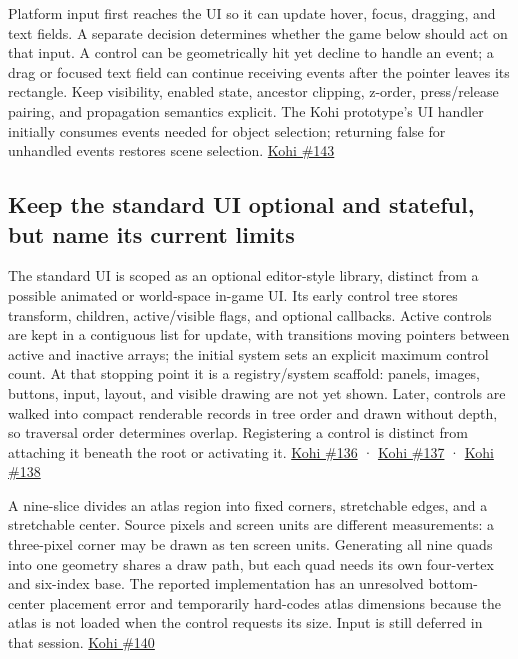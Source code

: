 \hypertarget{05-engine-i-ch013-treat-input-capture-as-a-route-not-a-hit-test-result}{}

Platform input first reaches the UI so it can update hover, focus, dragging, and text fields. A separate decision determines whether the game below should act on that input. A control can be geometrically hit yet decline to handle an event; a drag or focused text field can continue receiving events after the pointer leaves its rectangle. Keep visibility, enabled state, ancestor clipping, z-order, press/release pairing, and propagation semantics explicit. The Kohi prototype's UI handler initially consumes events needed for object selection; returning false for unhandled events restores scene selection. \href{https://www.youtube.com/watch?v=jLSfss8YrXE}{Kohi \#143}

\subsection{Keep the standard UI optional and stateful, but name its current limits}\label{05-engine-i-ch013-keep-the-standard-ui-optional-and-stateful-but-name-its-current-limits}

\hypertarget{05-engine-i-ch013-keep-the-standard-ui-optional-and-stateful-but-name-its-current-limits}{}

The standard UI is scoped as an optional editor-style library, distinct from a possible animated or world-space in-game UI. Its early control tree stores transform, children, active/visible flags, and optional callbacks. Active controls are kept in a contiguous list for update, with transitions moving pointers between active and inactive arrays; the initial system sets an explicit maximum control count. At that stopping point it is a registry/system scaffold: panels, images, buttons, input, layout, and visible drawing are not yet shown. Later, controls are walked into compact renderable records in tree order and drawn without depth, so traversal order determines overlap. Registering a control is distinct from attaching it beneath the root or activating it. \href{https://www.youtube.com/watch?v=IGt08az4bLA}{Kohi \#136} · \href{https://www.youtube.com/watch?v=ptdE4nbVN0U}{Kohi \#137} · \href{https://www.youtube.com/watch?v=xqExSNvOc6A}{Kohi \#138}

A nine-slice divides an atlas region into fixed corners, stretchable edges, and a stretchable center. Source pixels and screen units are different measurements: a three-pixel corner may be drawn as ten screen units. Generating all nine quads into one geometry shares a draw path, but each quad needs its own four-vertex and six-index base. The reported implementation has an unresolved bottom-center placement error and temporarily hard-codes atlas dimensions because the atlas is not loaded when the control requests its size. Input is still deferred in that session. \href{https://www.youtube.com/watch?v=C_uF9W2niD0}{Kohi \#140}


